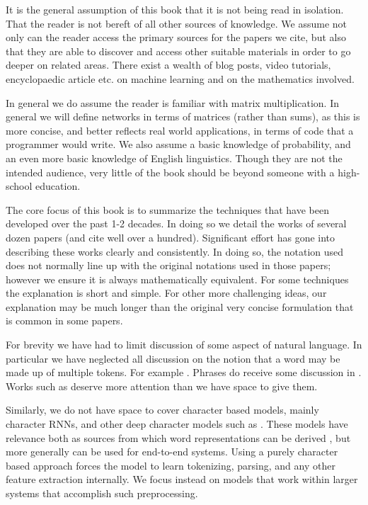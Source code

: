 \documentclass[12pt,parskip]{komatufte}
\begin{document}
It is the general assumption of this book that it is not being read in isolation.
That the reader is not bereft of all other sources of knowledge.
We assume not only can the reader access the primary sources for the papers we cite,
but also that they are able to discover and access other suitable materials 
in order to go deeper on related areas.
There exist a wealth of blog posts, video tutorials, encyclopaedic article etc. on machine learning and on the mathematics involved.

In general we do assume the reader is familiar with matrix multiplication.
In general we will define networks in terms of matrices (rather than sums),
as this is more concise, and better reflects real world applications,
in terms of code that a programmer would write.
We also assume a basic knowledge of probability, and an even more basic knowledge of English linguistics.
Though they are not the intended audience, very little of the book should be beyond someone with a high-school education.



The core focus of this book is to summarize the techniques that have been developed over the past 1-2 decades.
In doing so we detail the works of several dozen papers (and cite well over a hundred).
Significant effort has gone into describing these works clearly and consistently.
In doing so, the notation used does not normally line up with the original notations used in those papers; however we ensure it is always mathematically equivalent.
For some techniques the explanation is short and simple.
For other more challenging ideas, our explanation may be much longer than the original very concise formulation that is common in some papers.



For brevity we have had to limit discussion of some aspect of natural language.
In particular we have neglected all discussion on the notion that a word may be made up of multiple tokens.
For example .
Phrases do receive some discussion in .
Works such as  deserve more attention than we have space to give them.

Similarly, we do not have space to cover character based models,
mainly character RNNs, and other deep character models such as .
These models have relevance both as sources from which word representations can be derived ,
but more generally can be used for end-to-end systems.
Using a purely character based approach forces the model to learn tokenizing, parsing, and any other feature extraction internally.
We focus instead on models that work within larger systems that accomplish such preprocessing.
\end{document}
